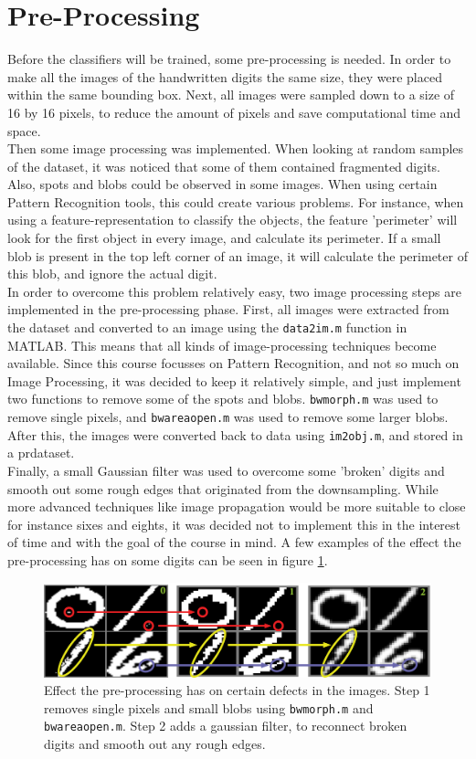 \section{Pre-Processing}
\label{sec:ImPros}
Before the classifiers will be trained, some pre-processing is needed. In order to make all the images of the handwritten digits the same size, they were placed within the same bounding box. Next, all images were sampled down to a size of 16 by 16 pixels, to reduce the amount of pixels and save computational time and space. \\
Then some image processing was implemented. When looking at random samples of the dataset, it was noticed that some of them contained fragmented digits. Also, spots and blobs could be observed in some images. When using certain Pattern Recognition tools, this could create various problems. For instance, when using a feature-representation to classify the objects, the feature 'perimeter' will look for the first object in every image, and calculate its perimeter. If a small blob is present in the top left corner of an image, it will calculate the perimeter of this blob, and ignore the actual digit. \\
In order to overcome this problem relatively easy, two image processing steps are implemented in the pre-processing phase. First, all images were extracted from the dataset and converted to an image using the \texttt{data2im.m} function in MATLAB. This means that all kinds of image-processing techniques become available. Since this course focusses on Pattern Recognition, and not so much on Image Processing, it was decided to keep it relatively simple, and just implement two functions to remove some of the spots and blobs. \texttt{bwmorph.m} was used to remove single pixels, and \texttt{bwareaopen.m} was used to remove some larger blobs. After this, the images were converted back to data using \texttt{im2obj.m}, and stored in a prdataset. \\
Finally, a small Gaussian filter was used to overcome some 'broken' digits and smooth out some rough edges that originated from the downsampling. While more advanced techniques like image propagation would be more suitable to close for instance sixes and eights, it was decided not to implement this in the interest of time and with the goal of the course in mind. A few examples of the effect the pre-processing has on some digits can be seen in figure \ref{fig:Image_Prepros}.
\begin{figure}[H]
	\centering
	\includegraphics[scale=0.45]{images/Image_Prepros.jpg}
	\caption{Effect the pre-processing has on certain defects in the images. Step 1 removes single pixels and small blobs using \texttt{bwmorph.m} and \texttt{bwareaopen.m}. Step 2 adds a gaussian filter, to reconnect broken digits and smooth out any rough edges.}
	\label{fig:Image_Prepros}
\end{figure}